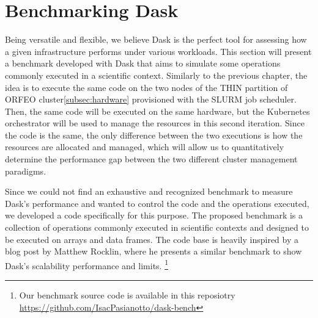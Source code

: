 \section{Benchmarking Dask}\label{sec:daskbenchmark}

Being versatile and flexible, we believe Dask is the perfect tool for assessing
how a given infrastructure performs under various workloads. This section will
present a benchmark developed with Dask that aims to simulate some operations
commonly executed in a scientific context. Similarly to the previous chapter,
the idea is to execute the same code on the two nodes of the THIN partition of
ORFEO cluster\ref{subsec:hardware} provisioned with the SLURM job scheduler.
Then, the same code will be executed on the same hardware, but the Kubernetes
orchestrator will be used to manage the resources in this second iteration.
Since the code is the same, the only difference between the two executions is
how the resources are allocated and managed, which will allow us to
quantitatively determine the performance gap between the two different cluster
management paradigms.


Since we could not find an exhaustive and recognized benchmark to measure Dask's
performance and wanted to control the code and the operations executed, we
developed a code specifically for this purpose.  The proposed benchmark is a
collection of operations commonly executed in scientific contexts and designed
to be executed on arrays and data frames. The code base is heavily inspired by a
blog post by Matthew Rocklin, where he presents a similar benchmark to show
Dask's scalability performance and limits\cite{Rocklinblog}. \footnote{ Our
benchmark source code is available in this
reposiotry \url{https://github.com/IsacPasianotto/dask-bench}} 

